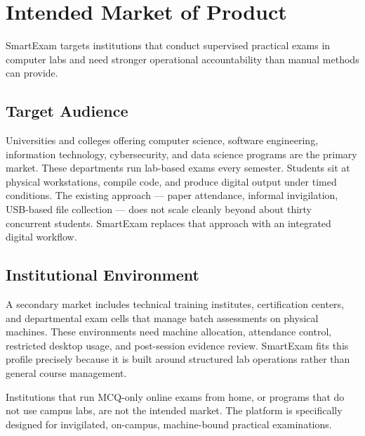 \section{Intended Market of Product}

SmartExam targets institutions that conduct supervised practical exams in computer labs and need stronger operational accountability than manual methods can provide.

\subsection{Target Audience}
Universities and colleges offering computer science, software engineering, information technology, cybersecurity, and data science programs are the primary market. These departments run lab-based exams every semester. Students sit at physical workstations, compile code, and produce digital output under timed conditions. The existing approach — paper attendance, informal invigilation, USB-based file collection — does not scale cleanly beyond about thirty concurrent students. SmartExam replaces that approach with an integrated digital workflow.

\subsection{Institutional Environment}
A secondary market includes technical training institutes, certification centers, and departmental exam cells that manage batch assessments on physical machines. These environments need machine allocation, attendance control, restricted desktop usage, and post-session evidence review. SmartExam fits this profile precisely because it is built around structured lab operations rather than general course management.

Institutions that run MCQ-only online exams from home, or programs that do not use campus labs, are not the intended market. The platform is specifically designed for invigilated, on-campus, machine-bound practical examinations.
